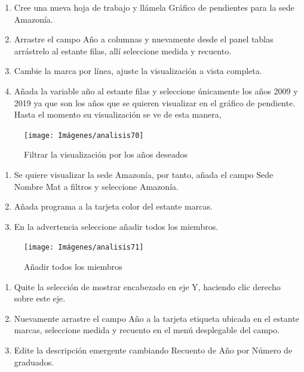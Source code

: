 \documentclass[
]{book}
\begin{document}
\begin{enumerate}
\def\labelenumi{\arabic{enumi}.}
\item
  Cree una nueva hoja de trabajo y llámela Gráfico de pendientes para la sede Amazonía.
\item
  Arrastre el campo Año a columnas y nuevamente desde el panel tablas arrástrelo al estante filas, allí seleccione medida y recuento.
\item
  Cambie la marca por línea, ajuste la visualización a vista completa.
\item
  Añada la variable año al estante filas y seleccione únicamente los años 2009 y 2019 ya que son los años que se quieren visualizar en el gráfico de pendiente. Hasta el momento su visualización se ve de esta manera,
\end{enumerate}

\begin{figure}

{\centering \texttt{[image: Imágenes/analisis70]} 

}

\caption{Filtrar la visualización por los años deseados}\label{fig:paso4graficopendiente-fig}
\end{figure}

\begin{enumerate}
\def\labelenumi{\arabic{enumi}.}
\setcounter{enumi}{4}
\item
  Se quiere visualizar la sede Amazonía, por tanto, añada el campo Sede Nombre Mat a filtros y seleccione Amazonía.
\item
  Añada programa a la tarjeta color del estante marcas.
\item
  En la advertencia seleccione añadir todos los miembros.
\end{enumerate}

\begin{figure}

{\centering \texttt{[image: Imágenes/analisis71]} 

}

\caption{Añadir todos los miembros}\label{fig:paso7graficopendiente-fig}
\end{figure}

\begin{enumerate}
\def\labelenumi{\arabic{enumi}.}
\setcounter{enumi}{7}
\item
  Quite la selección de mostrar encabezado en eje Y, haciendo clic derecho sobre este eje.
\item
  Nuevamente arrastre el campo Año a la tarjeta etiqueta ubicada en el estante marcas, seleccione medida y recuento en el menú desplegable del campo.
\item
  Edite la descripción emergente cambiando Recuento de Año por Número de graduados.
\end{enumerate}
\end{document}
